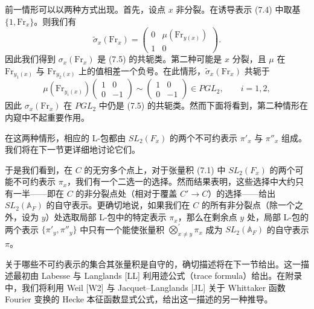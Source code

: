 \documentclass[11pt,a4paper]{article}
\begin{document}
前一情形可以以两种方式出现。首先，设点 $x$ 非分裂。在诱导表示 (7.4) 中取基 $\{1,\mathrm{Fr}_x\}$。则我们有
\[
\tilde\sigma_x(\mathrm{Fr}_x)=\begin{pmatrix}0&\mu(\mathrm{Fr}_{y(x)})\\ 1&0\end{pmatrix}.
\]
因此我们得到 $\sigma_x(\mathrm{Fr}_x)$ 是 (7.5) 的共轭类。第二种可能是 $x$ 分裂，且 $\mu$ 在 $\mathrm{Fr}_{y_1(x)}$ 与 $\mathrm{Fr}_{y_2(x)}$ 上的值相差一个负号。在此情形，$\tilde\sigma_x(\mathrm{Fr}_x)$ 共轭于
\begin{equation}\tag{7.6}
\mu(\mathrm{Fr}_{y_i(x)})\begin{pmatrix}1&0\\ 0&-1\end{pmatrix}\sim\begin{pmatrix}1&0\\ 0&-1\end{pmatrix}\in PGL_2,\qquad i=1,2,
\end{equation}
因此 $\sigma_x(\mathrm{Fr}_x)$ 在 $PGL_2$ 中仍是 (7.5) 的共轭类。然而下面将看到，第二种情形在内窥中不起重要作用。

在这两种情形，相应的 L-包都由 $SL_2(F_x)$ 的两个不可约表示 $\pi'_x$ 与 $\pi''_x$ 组成。我们将在下一节更详细地讨论它们。

于是我们看到，在 $C$ 的无穷多个点上，对于张量积 (7.1) 中 $SL_2(F_x)$ 的两个可能不可约表示 $\pi_x$，我们有一个二选一的选择。然而结果表明，这些选择中大约只有一半——即在 $C$ 的非分裂点处（相对于覆盖 $C'\to C$）的选择——给出 $SL_2(\mathbb{A}_F)$ 的自守表示。更确切地说，如果我们在 $C$ 的所有非分裂点（除一个之外，设为 $y$）处选取局部 L-包中的特定表示 $\pi_x$，那么在剩余点 $y$ 处，局部 L-包的两个表示 $\{\pi'_y,\pi''_y\}$ 中只有一个能使张量积 $\bigotimes_{x\neq y}^{\prime}\pi_x$ 成为 $SL_2(\mathbb{A}_F)$ 的自守表示 $\pi$。

关于哪些不可约表示的集合其张量积是自守的，确切描述将在下一节给出。这一描述最初由 Labesse 与 Langlands [LL] 利用迹公式（trace formula）给出。在附录中，我们将利用 Weil [W2] 与 Jacquet--Langlands [JL] 关于 Whittaker 函数 Fourier 变换的 Hecke 本征函数显式公式，给出这一描述的另一种推导。
\end{document}
